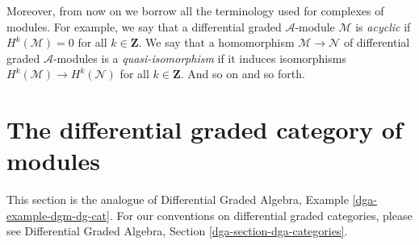 \medskip\noindent
Moreover, from now on we borrow all the terminology used for
complexes of modules. For example, we say that a differential
graded $\mathcal{A}$-module $\mathcal{M}$ is {\it acyclic} if
$H^k(\mathcal{M}) = 0$ for all $k \in \mathbf{Z}$. We say that a
homomorphism $\mathcal{M} \to \mathcal{N}$
of differential graded $\mathcal{A}$-modules is a {\it quasi-isomorphism}
if it induces isomorphisms $H^k(\mathcal{M}) \to H^k(\mathcal{N})$
for all $k \in \mathbf{Z}$. And so on and so forth.


















\section{The differential graded category of modules}
\label{section-dgm-dg-cat}

\noindent
This section is the analogue of
Differential Graded Algebra, Example \ref{dga-example-dgm-dg-cat}.
For our conventions on differential graded categories, please
see Differential Graded Algebra, Section \ref{dga-section-dga-categories}.

